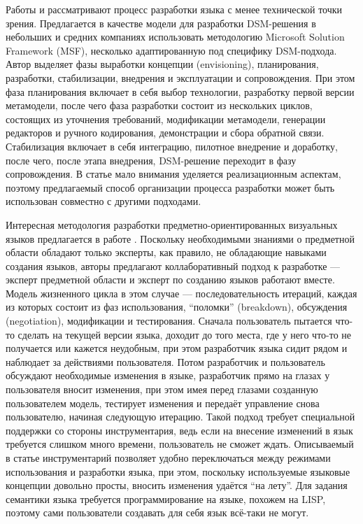 Работы \cite{koznov2011process} и \cite{koznov2008development} рассматривают процесс 
разработки языка с менее технической точки зрения. Предлагается в качестве модели 
для разработки DSM-решения в небольших и средних компаниях использовать методологию 
Microsoft Solution Framework (MSF), несколько адаптированную под специфику DSM-подхода. 
Автор выделяет фазы выработки концепции (envisioning), планирования, разработки, стабилизации, 
внедрения и эксплуатации и сопровождения. При этом фаза планирования включает в себя выбор 
технологии, разработку первой версии метамодели, после чего фаза разработки состоит из нескольких 
циклов, состоящих из уточнения требований, модификации метамодели, генерации редакторов 
и ручного кодирования, демонстрации и сбора обратной связи. Стабилизация включает 
в себя интеграцию, пилотное внедрение и доработку, после чего, после этапа внедрения, 
DSM-решение переходит в фазу сопровождения. В статье мало внимания уделяется реализационным 
аспектам, поэтому предлагаемый способ организации процесса разработки может быть использован 
совместно с другими подходами.

Интересная методология разработки предметно-ориентированных визуальных языков предлагается 
в работе \cite{repenning1995agentsheets}. Поскольку необходимыми знаниями о предметной 
области обладают только эксперты, как правило, не обладающие навыками создания языков, 
авторы предлагают коллаборативный подход к разработке --- эксперт предметной области 
и эксперт по созданию языков работают вместе. Модель жизненного цикла в этом случае 
--- последовательность итераций, каждая из которых состоит из фаз использования, "`поломки"' 
(breakdown), обсуждения (negotiation), модификации и тестирования. Сначала пользователь 
пытается что-то сделать на текущей версии языка, доходит до того места, где у него 
что-то не получается или кажется неудобным, при этом разработчик языка сидит рядом 
и наблюдает за действиями пользователя. Потом разработчик и пользователь обсуждают 
необходимые изменения в языке, разработчик прямо на глазах у пользователя вносит изменения, 
при этом имея перед глазами созданную пользователем модель, тестирует изменения и 
передаёт управление снова пользователю, начиная следующую итерацию. Такой подход требует 
специальной поддержки со стороны инструментария, ведь если на внесение изменений в 
язык требуется слишком много времени, пользователь не сможет ждать. Описываемый в 
статье инструментарий позволяет удобно переключаться между режимами использования и 
разработки языка, при этом, поскольку используемые языковые концепции довольно просты, 
вносить изменения удаётся "`на лету"'. Для задания семантики языка требуется программирование 
на языке, похожем на LISP, поэтому сами пользователи создавать для себя язык всё-таки 
не могут.

